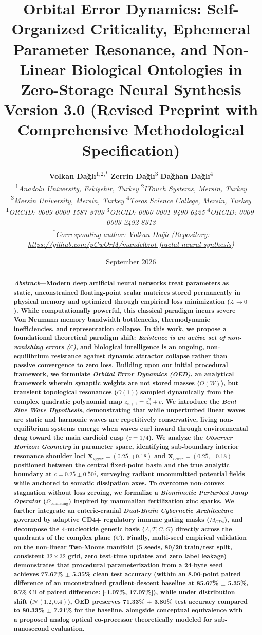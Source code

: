 \documentclass[10pt,journal,compsoc,twocolumn]{article}
\title{\textbf{\Large Orbital Error Dynamics: Self-Organized Criticality, Ephemeral Parameter Resonance, and Non-Linear Biological Ontologies in Zero-Storage Neural Synthesis} \\ \vspace{0.2cm}\large\textbf{Version 3.0 (Revised Preprint with Comprehensive Methodological Specification)}}
\author{
    \textbf{Volkan Dağlı}\textsuperscript{1,2,*} \quad \textbf{Zerrin Dağlı}\textsuperscript{3} \quad \textbf{Dağhan Dağlı}\textsuperscript{4} \\
    \textsuperscript{1}\textit{Anadolu University, Eskişehir, Turkey} \quad \textsuperscript{2}\textit{ITouch Systems, Mersin, Turkey} \\
    \textsuperscript{3}\textit{Mersin University, Mersin, Turkey} \quad \textsuperscript{4}\textit{Toros Science College, Mersin, Turkey} \\
    \textsuperscript{1}\textit{ORCID: 0009-0000-1587-8703} \quad \textsuperscript{3}\textit{ORCID: 0000-0001-9490-6425} \quad \textsuperscript{4}\textit{ORCID: 0009-0003-2492-8313} \\
    \textsuperscript{*}\textit{Corresponding author: Volkan Dağlı (Repository: \url{https://github.com/pCwOrM/mandelbrot-fractal-neural-synthesis})}
}
\date{September 2026}
\begin{document}
\maketitle

\begin{abstract}
\textbf{\textit{Abstract}---Modern deep artificial neural networks treat parameters as static, unconstrained floating-point scalar matrices stored permanently in physical memory and optimized through empirical loss minimization ($\mathcal{L} \to 0$). While computationally powerful, this classical paradigm incurs severe Von Neumann memory bandwidth bottlenecks, thermodynamic inefficiencies, and representation collapse. In this work, we propose a foundational theoretical paradigm shift: \textit{Existence is an active set of non-vanishing errors ($\mathcal{E}$)}, and biological intelligence is an ongoing, non-equilibrium resistance against dynamic attractor collapse rather than passive convergence to zero loss. Building upon our initial procedural framework, we formulate \textit{Orbital Error Dynamics (OED)}, an analytical framework wherein synaptic weights are not stored masses ($O(W)$), but transient topological resonances ($O(1)$) sampled dynamically from the complex quadratic polynomial map $z_{n+1} = z_n^2 + c$. We introduce the \textit{Bent Sine Wave Hypothesis}, demonstrating that while unperturbed linear waves are static and harmonic waves are repetitively conservative, living non-equilibrium systems emerge when waves curl inward through environmental drag toward the main cardioid cusp ($c = 1/4$). We analyze the \textit{Observer Horizon Geometry} in parameter space, identifying sub-boundary interior resonance shoulder loci $\mathbf{X}_{upper} = (0.25, +0.18)$ and $\mathbf{X}_{lower} = (0.25, -0.18)$ positioned between the central fixed-point basin and the true analytic boundary at $c = 0.25 \pm 0.50i$, surveying radiant uncommitted potential fields while anchored to somatic dissipation axes. To overcome non-convex stagnation without loss zeroing, we formalize a \textit{Biomimetic Perturbed Jump Operator} ($\Omega_{\mathrm{tunneling}}$) inspired by mammalian fertilization zinc sparks. We further integrate an enteric-cranial \textit{Dual-Brain Cybernetic Architecture} governed by adaptive CD4+ regulatory immune gating masks ($M_{CD4}$), and decompose the 4-nucleotide genetic basis ($A, T, C, G$) directly across the quadrants of the complex plane ($\mathbb{C}$). Finally, multi-seed empirical validation on the non-linear Two-Moons manifold (5 seeds, 80/20 train/test split, consistent $32 \times 32$ grid, zero test-time updates and zero label leakage) demonstrates that procedural parameterization from a 24-byte seed achieves 77.67\% $\pm$ 5.35\% clean test accuracy (within an 8.00-point paired difference of an unconstrained gradient-descent baseline at 85.67\% $\pm$ 5.35\%, 95\% CI of paired difference: [-1.07\%, 17.07\%]), while under distribution shift ($\mathcal{N}(1.2, 0.4)$), OED preserves 71.33\% $\pm$ 3.80\% test accuracy compared to 80.33\% $\pm$ 7.21\% for the baseline, alongside conceptual equivalence with a proposed analog optical co-processor theoretically modeled for sub-nanosecond evaluation.}
\end{abstract}
\end{document}
